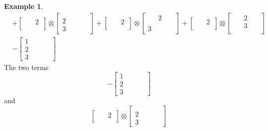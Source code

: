 \documentclass{amsart}
\theoremstyle{definition}
\newtheorem{example}[lemma]{Example}
\theoremstyle{remark}
\numberwithin{equation}{subsection}
\begin{document}
\begin{example}
\begin{align*}
&+ \left[\begin{matrix}\mathtt{\text{ }} & 2\\\mathtt{\text{ }} & \mathtt{\text{ }}\end{matrix}\right] \otimes \left[\begin{matrix}\mathtt{\text{ }} & \mathtt{\text{ }} & \mathtt{\text{ }}\\2 & \mathtt{\text{ }} & \mathtt{\text{ }}\\3 & \mathtt{\text{ }} & \mathtt{\text{ }}\end{matrix}\right] + \left[\begin{matrix}\mathtt{\text{ }} & 2\\\mathtt{\text{ }} & \mathtt{\text{ }}\end{matrix}\right] \otimes \left[\begin{matrix}\mathtt{\text{ }} & 2 & \mathtt{\text{ }}\\\mathtt{\text{ }} & \mathtt{\text{ }} & \mathtt{\text{ }}\\3 & \mathtt{\text{ }} & \mathtt{\text{ }}\end{matrix}\right] + \left[\begin{matrix}\mathtt{\text{ }} & 2\\\mathtt{\text{ }} & \mathtt{\text{ }}\end{matrix}\right] \otimes \left[\begin{matrix}\mathtt{\text{ }} & 2 & \mathtt{\text{ }}\\\mathtt{\text{ }} & 3 & \mathtt{\text{ }}\\\mathtt{\text{ }} & \mathtt{\text{ }} & \mathtt{\text{ }}\end{matrix}\right] \\
&- \left[\begin{matrix}1 & \mathtt{\text{ }} & \mathtt{\text{ }}\\2 & \mathtt{\text{ }} & \mathtt{\text{ }}\\3 & \mathtt{\text{ }} & \mathtt{\text{ }}\end{matrix}\right]
\end{align*}
The two terms
$$-\left[\begin{matrix}1 & \mathtt{\text{ }} & \mathtt{\text{ }}\\2 & \mathtt{\text{ }} & \mathtt{\text{ }}\\3 & \mathtt{\text{ }} & \mathtt{\text{ }}\end{matrix}\right]$$
and
$$\left[\begin{matrix}\mathtt{\text{ }} & 2\\\mathtt{\text{ }} & \mathtt{\text{ }}\end{matrix}\right] \otimes \left[\begin{matrix}\mathtt{\text{ }} & \mathtt{\text{ }} & \mathtt{\text{ }}\\2 & \mathtt{\text{ }} & \mathtt{\text{ }}\\3 & \mathtt{\text{ }} & \mathtt{\text{ }}\end{matrix}\right]$$

\end{example}
\end{document}
